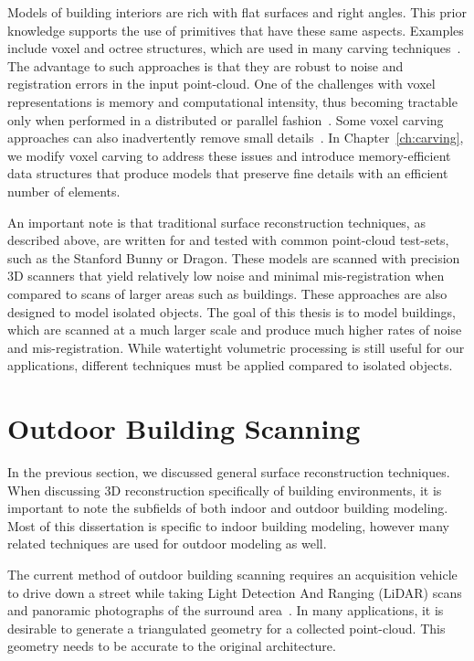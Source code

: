 \documentclass[12pt,onecolumn,oneside]{book}
\begin{document}
Models of building interiors are rich with flat surfaces and right angles.  This prior knowledge supports the use of primitives that have these same aspects.  Examples include voxel and octree structures, which are used in many carving techniques~\cite{OctreeSculpting,Carving,SpaceTime,VoxelSurfaceArea,Yang05}.  The advantage to such approaches is that they are robust to noise and registration errors in the input point-cloud.  One of the challenges with voxel representations is memory and computational intensity, thus becoming tractable only when performed in a distributed or parallel fashion~\cite{ParallelOctree}.  Some voxel carving approaches can also inadvertently remove small details~\cite{Carving}.  In Chapter~\ref{ch:carving}, we modify voxel carving to address these issues and introduce memory-efficient data structures that produce models that preserve fine details with an efficient number of elements.

An important note is that traditional surface reconstruction techniques, as described above, are written for and tested with common point-cloud test-sets, such as the Stanford Bunny or Dragon.  These models are scanned with precision 3D scanners that yield relatively low noise and minimal mis-registration when compared to scans of larger areas such as buildings.  These approaches are also designed to model isolated objects.  The goal of this thesis is to model buildings, which are scanned at a much larger scale and produce much higher rates of noise and mis-registration.  While watertight volumetric processing is still useful for our applications, different techniques must be applied compared to isolated objects.

\section{Outdoor Building Scanning}
\label{sec:outdoor_scanning}

In the previous section, we discussed general surface reconstruction techniques.  When discussing 3D reconstruction specifically of building environments, it is important to note the subfields of both indoor and outdoor building modeling.  Most of this dissertation is specific to indoor building modeling, however many related techniques are used for outdoor modeling as well.

The current method of outdoor building scanning requires an acquisition vehicle to drive down a street while taking Light Detection And Ranging (LiDAR) scans and panoramic photographs of the surround area~\cite{Zakhor07,Chen07,Karimi00,Li97}.  In many applications, it is desirable to generate a triangulated geometry for a collected point-cloud.  This geometry needs to be accurate to the original architecture.  
\end{document}
